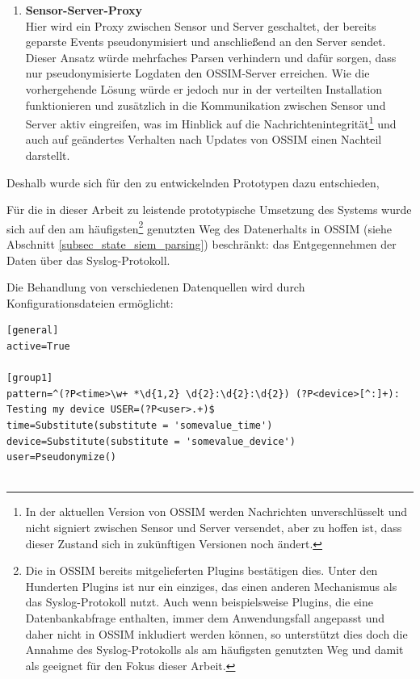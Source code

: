 {\begin{enumerate}
\item \textbf{Sensor-Server-Proxy}\\
  Hier wird ein Proxy zwischen Sensor und Server geschaltet, der bereits geparste Events pseudonymisiert und anschließend an den Server sendet. Dieser Ansatz würde mehrfaches Parsen verhindern und dafür sorgen, dass nur pseudonymisierte Logdaten den OSSIM-Server erreichen. Wie die vorhergehende Lösung würde er jedoch nur in der verteilten Installation funktionieren und zusätzlich in die Kommunikation zwischen Sensor und Server aktiv eingreifen, was im Hinblick auf die Nachrichtenintegrität\footnote{
    In der aktuellen Version von OSSIM werden Nachrichten unverschlüsselt und nicht signiert zwischen Sensor und Server versendet, aber zu hoffen ist, dass dieser Zustand sich in zukünftigen Versionen noch ändert.
  } und auch auf geändertes Verhalten nach Updates von OSSIM einen Nachteil darstellt.
  
\end{enumerate}

Deshalb wurde sich für den zu entwickelnden Prototypen dazu entschieden, 






Für die in dieser Arbeit zu leistende prototypische Umsetzung des Systems wurde sich auf den am häufigsten\footnote{
  Die in OSSIM bereits mitgelieferten Plugins bestätigen dies. Unter den Hunderten Plugins ist nur ein einziges, das einen anderen Mechanismus als das Syslog-Protokoll nutzt. Auch wenn beispielsweise Plugins, die eine Datenbankabfrage enthalten, immer dem Anwendungsfall angepasst und daher nicht in OSSIM inkludiert werden können, so unterstützt dies doch die Annahme des Syslog-Protokolls als am häufigsten genutzten Weg und damit als geeignet für den Fokus dieser Arbeit.
} genutzten Weg des Datenerhalts in OSSIM (siehe Abschnitt \ref{subsec_state_siem_parsing}) beschränkt: das Entgegennehmen der Daten über das Syslog-Protokoll. 




Die Behandlung von verschiedenen Datenquellen wird durch Konfigurationsdateien ermöglicht:

\begin{lstlisting}[morekeywords={general,active,pattern,group1,group2}]
[general]
active=True

[group1]
pattern=^(?P<time>\w+ *\d{1,2} \d{2}:\d{2}:\d{2}) (?P<device>[^:]+): Testing my device USER=(?P<user>.+)$
time=Substitute(substitute = 'somevalue_time')
device=Substitute(substitute = 'somevalue_device')
user=Pseudonymize()


\end{lstlisting}}
